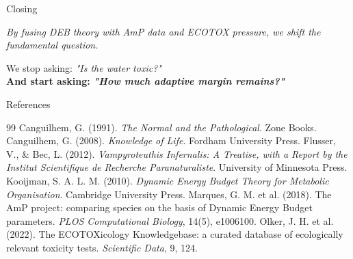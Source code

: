 \documentclass[aspectratio=169,11pt,xcolor=table]{beamer}
\newcommand{\bigquote}[1]{%
	\begin{center}
		\begin{minipage}{0.88\linewidth}
			\centering\Large\itshape #1
		\end{minipage}
\end{center}}
\begin{document}
	\begin{frame}{Closing}
		\bigquote{By fusing DEB theory with AmP data and ECOTOX pressure, we shift the fundamental question.}
		\vspace{0.4em}
		\begin{center}
			\Large We stop asking: \textit{"Is the water toxic?"} \\
			\vspace{0.8em}
			\Large\bfseries And start asking: \textit{"How much adaptive margin remains?"}
		\end{center}
	\end{frame}
	
	\appendix
	\begin{frame}[allowframebreaks]{References}
		\scriptsize
		\begin{thebibliography}{99}
			 Canguilhem, G. (1991). \emph{The Normal and the Pathological}. Zone Books.
			 Canguilhem, G. (2008). \emph{Knowledge of Life}. Fordham University Press.
			 Flusser, V., \& Bec, L. (2012). \emph{Vampyroteuthis Infernalis: A Treatise, with a Report by the Institut Scientifique de Recherche Paranaturaliste}. University of Minnesota Press.
			 Kooijman, S. A. L. M. (2010). \emph{Dynamic Energy Budget Theory for Metabolic Organisation}. Cambridge University Press.
			 Marques, G. M. et al. (2018). The AmP project: comparing species on the basis of Dynamic Energy Budget parameters. \emph{PLOS Computational Biology}, 14(5), e1006100.
			 Olker, J. H. et al. (2022). The ECOTOXicology Knowledgebase: a curated database of ecologically relevant toxicity tests. \emph{Scientific Data}, 9, 124.
		\end{thebibliography}
	\end{frame}
	
\end{document}
